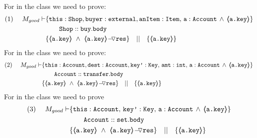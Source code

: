 \begin{proofO}
\noindent
For    in the  class we need to prove:
\small
\begin{align*}
\text{(1)}  \ \ \ \ M_{good} \vdash 
		&	\{  \prg{this}:\prg{Shop}, \prg{buyer} : \prg{external}, \prg{anItem} : \prg{Item},\, \prg{a}:\prg{Account}\,\wedge\, 
				{\inside{\prg{a.key}}} \} \\
		& \SPTG \prg{Shop}::\prg{buy}.\prg{body}\ \\  
		& \{ {\inside{\prg{a.key}}}\ \wedge\ {\PushASLong {\prg{res}} {\inside{\prg{a.key}}}}  \} \ \ \  || \ \ \ 
		   \{ {\inside{\prg{a.key}}} \}
\end{align*}
\normalsize
For  in the  class we need to prove:
\small
\begin{align*}
\text{(2)}  \ \ \ \ M_{good} \vdash 
		&	\{  \prg{this}:\prg{Account}, \prg{dest} : \prg{Account}, 
			\prg{key'} : \prg{Key},\, \prg{amt}:\prg{int},\, \prg{a}:\prg{Account}\,
			\wedge\,{\inside{\prg{a.key}}} \} \\
		&\SPTG \prg{Account}::\prg{transfer}.\prg{body}\ \\  
		& \{ {\inside{\prg{a.key}}}\ \wedge\ {\PushASLong {\prg{res}} {\inside{\prg{a.key}}}}  \} \ \ \  || \ \ \ 
		   \{ {\inside{\prg{a.key}}} \}
\end{align*}
\normalsize
For  in the  class we need to prove
\small
\begin{align*}
\text{(3)}  \ \ \ \ M_{good} \vdash 
		&	\{  \prg{this}:\prg{Account},\,
			\prg{key'} : \prg{Key},\, \prg{a}:\prg{Account}\,
			\wedge\,{\inside{\prg{a.key}}} \} \\
		& \SPTG \prg{Account}::\prg{set}.\prg{body}\ \\  
		& \{ {\inside{\prg{a.key}}}\ \wedge\ {\PushASLong {\prg{res}} {\inside{\prg{a.key}}}}  \} \ \ \  || \ \ \ 
		   \{ {\inside{\prg{a.key}}} \}
\end{align*}
\normalsize


\end{proofO}

